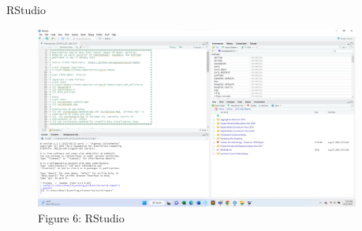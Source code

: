 \documentclass[pdf]{beamer}
\theoremstyle{remark}
\theoremstyle{definition}
\begin{document}
\begin{frame}[t]{RStudio}
\begin{figure}[htbp]
  \captionsetup{justification=centering}
  \includegraphics[height=6cm, trim=0.0cm 0.0cm 0.0cm 0.0cm width=6cm]{Images/R_Console.png}
  \caption{Figure {\color{franklinblue} 6}: RStudio }
\end{figure}
\end{frame}
\end{document}
